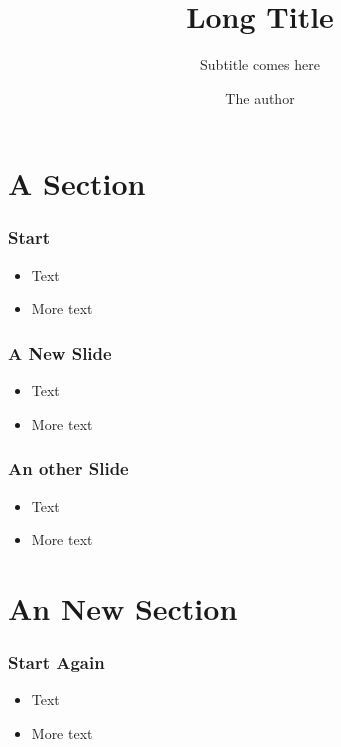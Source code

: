 \documentclass{beamer}
\title[Short Title]{Long Title}
\subtitle{Subtitle comes here}
\author{The author}
\institute{The Institute}
\date{}
\begin{document}
\maketitle




\section{A Section}

\begin{frame} 
\frametitle{Start}
\begin{itemize}
 \item Text
 \item More text
\end{itemize}
\end{frame}

\begin{frame} 
\frametitle{A New Slide}
\begin{itemize}
 \item Text
 \item More text
\end{itemize}
\end{frame}

\begin{frame} 
\frametitle{An other Slide}
\begin{itemize}
 \item Text
 \item More text
\end{itemize}
\end{frame}

\section{An New Section}
\begin{frame} 
\frametitle{Start Again}
\begin{itemize}
 \item Text
 \item More text
\end{itemize}
\end{frame}
\end{document}

